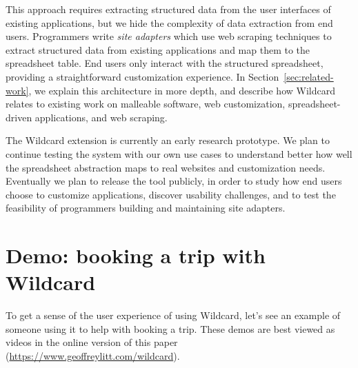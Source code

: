 \documentclass[english,submission]{programming}
\begin{document}
This approach requires extracting structured data from the user
interfaces of existing applications, but we hide the complexity of data
extraction from end users. Programmers write \emph{site adapters} which
use web scraping techniques to extract structured data from existing
applications and map them to the spreadsheet table. End users only
interact with the structured spreadsheet, providing a straightforward
customization experience. In Section~\ref{sec:related-work}, we explain
this architecture in more depth, and describe how Wildcard relates to
existing work on malleable software, web customization,
spreadsheet-driven applications, and web scraping.

The Wildcard extension is currently an early research prototype. We plan
to continue testing the system with our own use cases to understand
better how well the spreadsheet abstraction maps to real websites and
customization needs. Eventually we plan to release the tool publicly, in
order to study how end users choose to customize applications, discover
usability challenges, and to test the feasibility of programmers
building and maintaining site adapters.

\hypertarget{sec:demos}{%
\section{Demo: booking a trip with Wildcard}\label{sec:demos}}

To get a sense of the user experience of using Wildcard, let's see an
example of someone using it to help with booking a trip.{ These demos
are best viewed as videos in the online version of this paper
(\url{https://www.geoffreylitt.com/wildcard}).}
\end{document}
